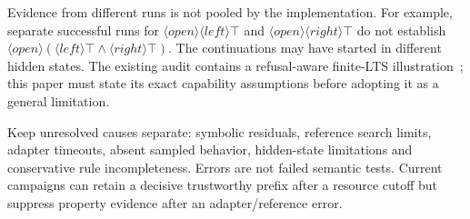 Evidence from different runs is not pooled by the implementation. For example,
separate successful runs for $\langle open\rangle\langle left\rangle\top$ and
$\langle open\rangle\langle right\rangle\top$ do not establish
$\langle open\rangle(\langle left\rangle\top\land\langle right\rangle\top)$.
The continuations may have started in different hidden states. The existing audit
contains a refusal-aware finite-LTS illustration~\cite{audit}; this paper must
state its exact capability assumptions before adopting it as a general limitation.

Keep unresolved causes separate: symbolic residuals, reference search limits,
adapter timeouts, absent sampled behavior, hidden-state limitations and conservative
rule incompleteness. Errors are not failed semantic tests. Current campaigns can
retain a decisive trustworthy prefix after a resource cutoff but suppress property
evidence after an adapter/reference error.
